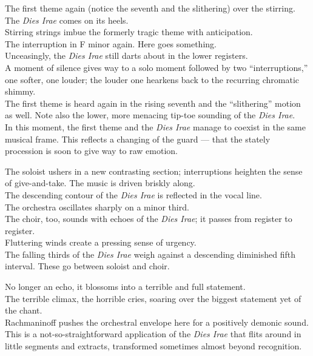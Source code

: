 \documentclass{beamer}
\begin{document}
\begin{frame} 
  The first theme again (notice the seventh and the slithering) over the stirring. 
  \pause \\
  The \textit{Dies Irae} comes on its heels. 
  \pause \\ 
  Stirring strings imbue the formerly tragic theme with anticipation. 
  \pause \\ 
  The interruption in F minor again. Here goes something. 
  \pause \\ 
  Unceasingly, the \textit{Dies Irae} still darts about in the lower registers. 
  \pause \\ 
  A moment of silence gives way to a solo moment followed by two ``interruptions,'' one softer, one louder; the louder one hearkens back to the recurring chromatic shimmy. 
  \pause \\ 
  The first theme is heard again in the rising seventh and the ``slithering'' motion as well. Note also the lower, more menacing tip-toe sounding of the \textit{Dies Irae}. 
  \pause \\ 
  In this moment, the first theme and the \textit{Dies Irae} manage to coexist in the same musical frame. This reflects a changing of the guard --- that the stately procession is soon to give way to raw emotion. 
\end{frame} 

\begin{frame}
  The soloist ushers in a new contrasting section; interruptions heighten the sense of give-and-take. The music is driven briskly along. 
  \pause \\ 
  The descending contour of the \textit{Dies Irae} is reflected in the vocal line. 
  \pause \\
  The orchestra oscillates sharply on a minor third. 
  \pause \\ 
  The choir, too, sounds with echoes of the \textit{Dies Irae}; it passes from register to register. 
  \pause \\
  Fluttering winds create a pressing sense of urgency. 
  \pause \\ 
  The falling thirds of the \textit{Dies Irae} weigh against a descending diminished fifth interval. These go between soloist and choir. 
\end{frame} 

\begin{frame}
  No longer an echo, it blossoms into a terrible and full statement. 
  \pause \\ 
  The terrible climax, the horrible cries, soaring over the biggest statement yet of the chant. 
  \pause \\ 
  Rachmaninoff pushes the orchestral envelope here for a positively demonic sound. 
  \pause \\ 
  This is a not-so-straightforward application of the \textit{Dies Irae} that flits around in little segments and extracts, transformed sometimes almost beyond recognition. 
\end{frame} 
\end{document}
